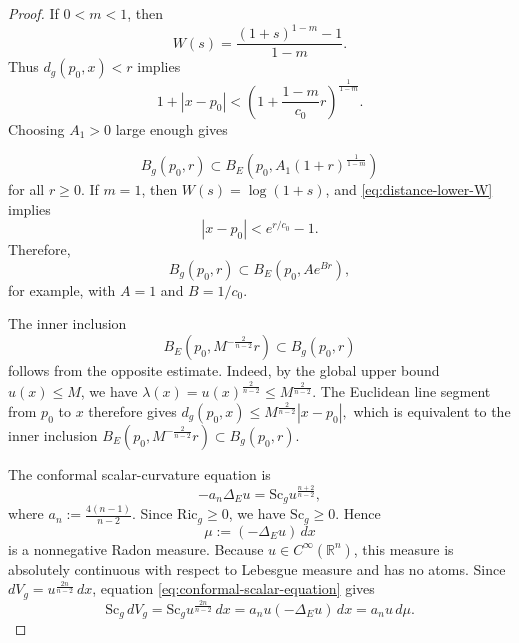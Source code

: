 \documentclass[12pt,oneside,a4paper]{article}
\theoremstyle{mytheorem}
\theoremstyle{remark}
\begin{document}
\begin{proof}
If $0<m<1$, then
\[
W(s)=\frac{(1+s)^{1-m}-1}{1-m}.
\]
Thus $d_g(p_0,x)<r$ implies
\[
1+|x-p_0|<\left(1+\frac{1-m}{c_0}r\right)^{\frac{1}{1-m}}.
\]
Choosing $A_1>0$ large enough gives 

\begin{equation}\label{eq:ball-containment-subcritical}
B_g(p_0,r)
\subset
B_E\left(p_0,A_1(1+r)^{\frac{1}{1-m}}\right)
\end{equation}
 for
all $r\ge0$.  If $m=1$, then $W(s)=\log(1+s)$, and \eqref{eq:distance-lower-W}
implies
\[
|x-p_0|<e^{r/c_0}-1.
\]
Therefore, \begin{equation}\label{eq:ball-containment-critical}
B_g(p_0,r)
\subset
B_E(p_0,Ae^{Br}),
\end{equation} for example, with $A=1$ and
$B=1/c_0$.

The inner inclusion$$B_E\!\left(p_0,M^{-\frac{2}{n-2}}r\right) \subset B_g(p_0,r)$$follows from the opposite estimate. Indeed, by the global upper bound $u(x) \le M$, we have $\lambda(x)=u(x)^{\frac{2}{n-2}}\le M^{\frac{2}{n-2}}.$ The Euclidean line segment from $p_0$ to $x$ therefore gives $d_g(p_0,x)\le M^{\frac{2}{n-2}}|x-p_0|,$ which is equivalent to the inner inclusion $B_E\!\left(p_0,M^{-\frac{2}{n-2}}r\right) \subset B_g(p_0,r).$

The conformal scalar-curvature equation is
\begin{equation}\label{eq:conformal-scalar-equation}
-a_n\Delta_Eu=\mathrm{Sc}_g u^{\frac{n+2}{n-2}},
\end{equation}
where $a_n := \frac{4(n-1)}{n-2}$. Since $\mathrm{Ric}_g\ge0$, we have $\mathrm{Sc}_g\ge0$.  Hence
\[
\mu:=(-\Delta_Eu)\,d x
\]
is a nonnegative Radon measure.  Because $u\in C^\infty(\mathbb{R}^n)$, this measure is
absolutely continuous with respect to Lebesgue measure and has no atoms.  Since
$dV_g=u^{\frac{2n}{n-2}}\,d x$, equation \eqref{eq:conformal-scalar-equation}
gives
\begin{equation}\label{eq:scalar-measure-identity}
\mathrm{Sc}_g\,dV_g
=\mathrm{Sc}_gu^{\frac{2n}{n-2}}\,d x
=a_nu(-\Delta_Eu)\,d x
=a_nu\,d\mu.
\end{equation}


\end{proof}
\end{document}
